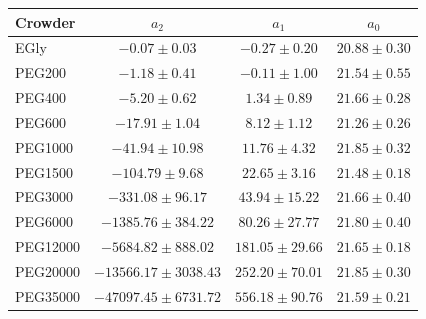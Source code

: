 \begin{tabular}{lccc}
\toprule
Crowder & $a_2$ & $a_1$ & $a_0$ \\
\midrule
EGly & $-0.07\pm0.03$ & $-0.27\pm0.20$ & $20.88\pm0.30$ \\
PEG200 & $-1.18\pm0.41$ & $-0.11\pm1.00$ & $21.54\pm0.55$ \\
PEG400 & $-5.20\pm0.62$ & $1.34\pm0.89$ & $21.66\pm0.28$ \\
PEG600 & $-17.91\pm1.04$ & $8.12\pm1.12$ & $21.26\pm0.26$ \\
PEG1000 & $-41.94\pm10.98$ & $11.76\pm4.32$ & $21.85\pm0.32$ \\
PEG1500 & $-104.79\pm9.68$ & $22.65\pm3.16$ & $21.48\pm0.18$ \\
PEG3000 & $-331.08\pm96.17$ & $43.94\pm15.22$ & $21.66\pm0.40$ \\
PEG6000 & $-1385.76\pm384.22$ & $80.26\pm27.77$ & $21.80\pm0.40$ \\
PEG12000 & $-5684.82\pm888.02$ & $181.05\pm29.66$ & $21.65\pm0.18$ \\
PEG20000 & $-13566.17\pm3038.43$ & $252.20\pm70.01$ & $21.85\pm0.30$ \\
PEG35000 & $-47097.45\pm6731.72$ & $556.18\pm90.76$ & $21.59\pm0.21$ \\
\bottomrule
\end{tabular}
